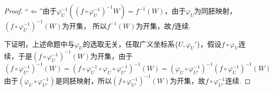 \documentclass[12pt, a4paper, oneside]{ctexart}
\begin{document}
\begin{proof}
    “$\Leftarrow$”由于$\varphi_U^{-1}((f\circ \varphi_U^{-1})^{-1}W) = f^{-1}(W)$，由于$\varphi_U$为同胚映射，$(f\circ\varphi_U^{-1})^{-1}(W)$为开集，
    所以$f^{-1}(W)$为开集，故$f$连续.

    下证明，上述命题中与$\varphi_U$的选取无关，任取广义坐标系$\{U,\varphi_U'\}$，假设$f\circ \varphi_U$连续，于是$(f\circ\varphi_U^{-1})^{-1}(W)$为开集，由于
    \begin{equation*}
        (f\circ\varphi_{U'}^{-1})^{-1}(W) = (f\circ\varphi_U^{-1}\circ\varphi_U\circ\varphi_{U'}^{-1})^{-1}(W) = (\varphi_U\circ\varphi_{U'}^{-1})^{-1}(f\circ\varphi_U^{-1})^{-1}(W)
    \end{equation*}
    由于$(\varphi_U\circ\varphi_{U'}^{-1})$是同胚映射，所以$(f\circ\varphi_{U'}^{-1})^{-1}(W)$为开集，故$f\circ\varphi_{U'}^{-1}$连续.
\end{proof}
\end{document}
